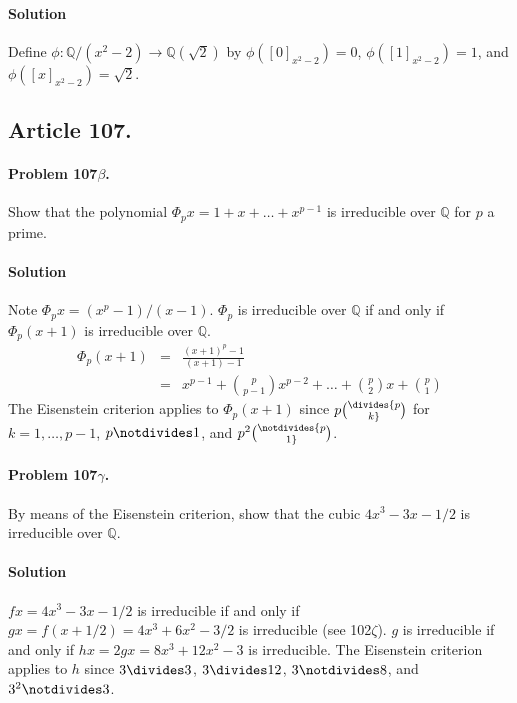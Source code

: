 \paragraph*{Solution}
Define $\phi: \mathbb{Q}/(x^2-2) \rightarrow \mathbb{Q}(\sqrt{2})$ by
$\phi([0]_{x^2-2}) = 0$, $\phi([1]_{x^2-2}) = 1$, and
$\phi([x]_{x^2-2}) = \sqrt{2}$.

\subsection{Article 107.}

\paragraph{Problem 107$\beta$.}
Show that the polynomial $\Phi_p x = 1 + x + \dots + x^{p-1}$ is irreducible
over $\mathbb{Q}$ for $p$ a prime.

\paragraph*{Solution}
Note $\Phi_p x = (x^p - 1) / (x - 1)$.
$\Phi_p$ is irreducible over $\mathbb{Q}$ if and only if $\Phi_p(x+1)$ is
irreducible over $\mathbb{Q}$.
\begin{eqnarray*}
\Phi_p(x+1) &=& \frac{(x+1)^p - 1}{(x+1) - 1} \\
&=& x^{p-1} + {{p}\choose{p-1}} x^{p-2} + \dots + {{p}\choose{2}} x + {{p}\choose{1}}
\end{eqnarray*}
The Eisenstein criterion applies to $\Phi_p(x+1)$ since $p \divides {{p}\choose{k}}$
for $k = 1, \dots, p-1$, $p \notdivides 1$, and $p^2 \notdivides {{p}\choose{1}}$.

\paragraph{Problem 107$\gamma$.}
By means of the Eisenstein criterion, show that the cubic $4x^3-3x-1/2$ is
irreducible over $\mathbb{Q}$.

\paragraph*{Solution}
$fx = 4x^3 - 3x - 1/2$ is irreducible if and only if $gx = f(x+1/2) =
4x^3 + 6x^2 - 3/2$ is irreducible (see 102$\zeta$). $g$ is irreducible if and
only if $hx = 2gx = 8x^3 + 12x^2 - 3$ is irreducible. The Eisenstein criterion
applies to $h$ since $3 \divides 3$, $3 \divides 12$, $3 \notdivides 8$, and
$3^2 \notdivides 3$.



